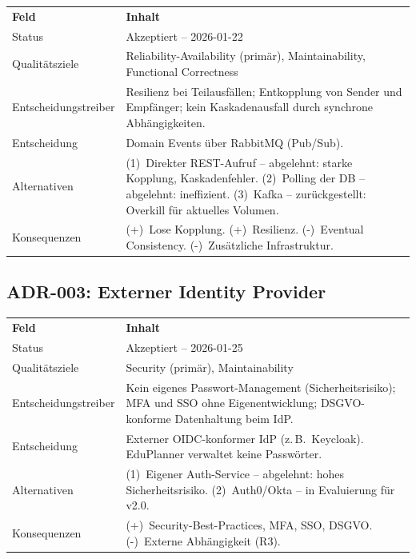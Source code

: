 \begin{tabularx}{\textwidth}{L{3.5cm} X}
  \color{white}\textbf{Feld} & \color{white}\textbf{Inhalt} \\
  Status & Akzeptiert -- 2026-01-22 \\
  Qualitätsziele & Reliability-Availability (primär), Maintainability, Functional Correctness \\
  Entscheidungstreiber & Resilienz bei Teilausfällen; Entkopplung von Sender und Empfänger; kein Kaskadenausfall durch synchrone Abhängigkeiten. \\
  Entscheidung & Domain Events über RabbitMQ (Pub/Sub). \\
  Alternativen & (1)~Direkter REST-Aufruf -- abgelehnt: starke Kopplung, Kaskadenfehler. (2)~Polling der DB -- abgelehnt: ineffizient. (3)~Kafka -- zurückgestellt: Overkill für aktuelles Volumen. \\
  Konsequenzen & (+)~Lose Kopplung. (+)~Resilienz. (-)~Eventual Consistency. (-)~Zusätzliche Infrastruktur. \\
\end{tabularx}

\subsection{ADR-003: Externer Identity Provider}

\begin{tabularx}{\textwidth}{L{3.5cm} X}
  \color{white}\textbf{Feld} & \color{white}\textbf{Inhalt} \\
  Status & Akzeptiert -- 2026-01-25 \\
  Qualitätsziele & Security (primär), Maintainability \\
  Entscheidungstreiber & Kein eigenes Passwort-Management (Sicherheitsrisiko); MFA und SSO ohne Eigenentwicklung; DSGVO-konforme Datenhaltung beim IdP. \\
  Entscheidung & Externer OIDC-konformer IdP (z.\,B.\ Keycloak). EduPlanner verwaltet keine Passwörter. \\
  Alternativen & (1)~Eigener Auth-Service -- abgelehnt: hohes Sicherheitsrisiko. (2)~Auth0/Okta -- in Evaluierung für v2.0. \\
  Konsequenzen & (+)~Security-Best-Practices, MFA, SSO, DSGVO. (-)~Externe Abhängigkeit (R3). \\
\end{tabularx}

